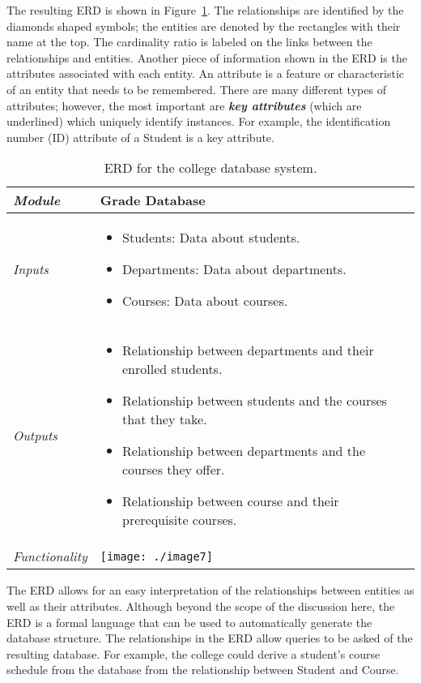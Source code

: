 The resulting ERD is shown in Figure~\ref{table:erdCollegeSystem}. 
The relationships are
identified by the diamonds shaped symbols; the entities are denoted by
the rectangles with their name at the top. The cardinality ratio is
labeled on the links between the relationships and entities. Another
piece of information shown in the ERD is the attributes associated with
each entity. An attribute is a feature or characteristic of an entity
that needs to be remembered. There are many different types of
attributes; however, the most important are \textbf{\emph{key
attributes}} (which are underlined) which uniquely identify instances.
For example, the identification number (ID) attribute of a Student is a
key attribute.


\begin{table}
\caption{ERD for the college database system.}
\label{table:erdCollegeSystem}
\begin{tabular}{|l|m{10cm}|}
\hline
\emph{Module} & Grade Database \\ \hline

\emph{Inputs} & 
\begin{itemize}
\item
  Students: Data about students.
\item
  Departments: Data about departments.
\item
  Courses: Data about courses.
\end{itemize} \\ \hline
\emph{Outputs} & 
\begin{itemize}
\item
  Relationship between departments and their enrolled students.
\item
  Relationship between students and the courses that they take.
\item
  Relationship between departments and the courses they offer.
\item
  Relationship between course and their prerequisite courses.
\end{itemize} \\ \hline
\emph{Functionality} &
\texttt{[image: ./image7]} \\
\end{tabular}
\end{table}

The ERD allows for an easy interpretation of the relationships between
entities as well as their attributes. Although beyond the scope of the
discussion here, the ERD is a formal language that can be used to
automatically generate the database structure. The relationships in the
ERD allow queries to be asked of the resulting database. For example,
the college could derive a student's course schedule from the database
from the relationship between Student and Course.

